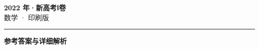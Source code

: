 \documentclass[zihao=5, a4paper]{ctexart}
\begin{document}
\begin{center}
  {\Large\bfseries 2022 年·新高考Ⅰ卷}\\[4pt]
  {\large 数学 · 印刷版}
\end{center}
\medskip
{}

\par\bigskip\hrule\bigskip
{}
\begin{center}{\large\bfseries 参考答案与详细解析}\end{center}
\smallskip

\end{document}
